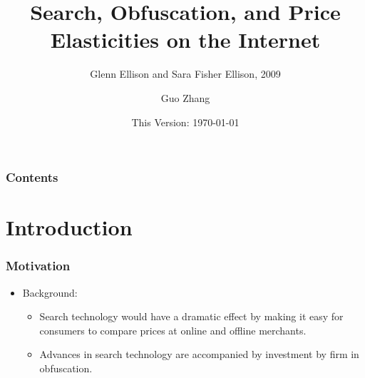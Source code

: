 \documentclass{beamer}
\title{Search, Obfuscation, and Price Elasticities on the Internet}
\subtitle{Glenn Ellison and Sara Fisher Ellison, 2009}
\author{Guo Zhang}
\institute[Universities of]
{
WISE, Xiamen University
}
\date{This Version: \today}
\begin{document}
\begin{frame}[plain]
\maketitle
\end{frame}

\begin{frame}[plain] %
\frametitle{Contents}
\small
\begin{multicols}{2}
  \tableofcontents
\end{multicols}
\end{frame}

\section{Introduction}
\begin{frame}
\frametitle{Motivation}
\begin{itemize}
\item Background:
  \begin{itemize}
  \item Search technology would have a dramatic effect by making it easy for consumers to compare prices at online and offline merchants.
  \item Advances in search technology are accompanied by investment by firm in obfuscation.
  \end{itemize}
\end{itemize}
\end{frame}
\end{document}
